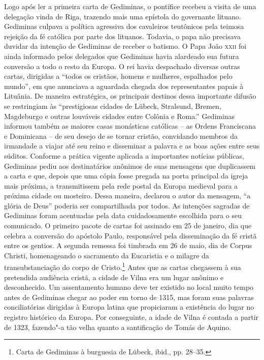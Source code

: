 Logo após ler a primeira carta de Gediminas, o pontífice recebeu a
visita de uma delegação vinda de Riga, trazendo mais uma epístola do
governante lituano. Gediminas culpava a política agressiva dos
cavaleiros teutônicos pela teimosa rejeição da fé católica por parte dos
lituanos. Todavia, o papa não precisava duvidar da intenção de Gediminas
de receber o batismo. O Papa João \textsc{xxii} foi ainda informado pelos
delegados que Gediminas havia alardeado sua futura conversão a todo o
resto da Europa. O rei havia despachado diversas outras cartas,
dirigidas a ``todos os cristãos, homens e mulheres, espalhados pelo
mundo'', em que anunciava a aguardada chegada dos representantes papais
à Lituânia. De maneira estratégica, os principais destinos dessa
importante difusão se restringiam às ``prestigiosas cidades de Lübeck,
Stralsund, Bremen, Magdeburgo e outras louváveis cidades entre Colônia e
Roma.'' Gediminas informou também as maiores casas monásticas católicas
-- as Ordens Franciscana e Dominicana -- de seu desejo de se tornar
cristão, convidando membros da irmandade a viajar até seu reino e
disseminar a palavra e as boas ações entre seus súditos. Conforme a
prática vigente aplicada a importantes notícias públicas, Gediminas
pediu aos destinatários anônimos de suas mensagens que duplicassem a
carta e que, depois que uma cópia fosse pregada na porta principal da
igreja mais próxima, a transmitissem pela rede postal da Europa medieval
para a próxima cidade ou mosteiro. Dessa maneira, declarou o autor da
mensagem, ``a glória de Deus'' poderia ser compartilhada por todos. As
intenções sagradas de Gediminas foram acentuadas pela data
cuidadosamente escolhida para o seu comunicado. O primeiro pacote de
cartas foi assinado em 25 de janeiro, dia que celebra a conversão do
apóstolo Paulo, responsável pela disseminação da fé cristã entre os
gentios. A segunda remessa foi timbrada em 26 de maio, dia de
Corpus Christi, homenageando o sacramento da Eucaristia e o
milagre da transubstanciação do corpo de Cristo.\footnote{Carta de Gediminas à burguesia de Lübeck, ibid., pp. 28--35.}
Antes que as cartas chegassem à sua pretendida audiência cristã, a
cidade de Vilna era um lugar anônimo e desconhecido. Um assentamento
humano deve ter existido no local muito tempo antes de Gediminas chegar
ao poder em torno de 1315, mas foram suas palavras conciliatórias
dirigidas à Europa latina que propiciaram a existência do lugar no
registro histórico da Europa. Por conseguinte, a idade de Vilna é
contada a partir de 1323, fazendo"-a tão velha quanto a santificação de
Tomás de Aquino.

